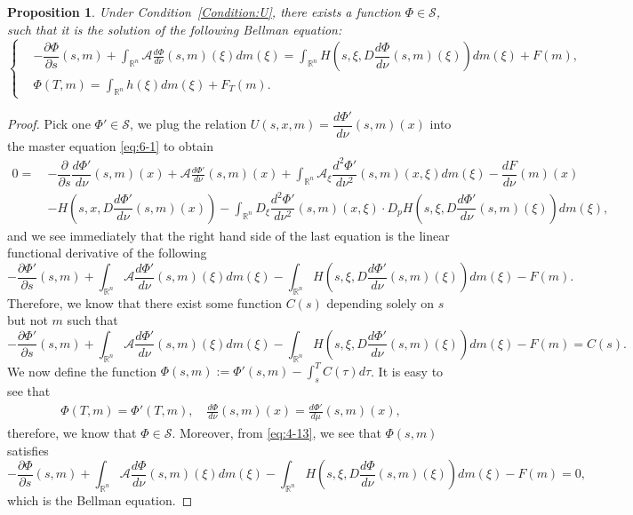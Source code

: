\documentclass[11pt]{article}
\numberwithin{equation}{section}
\newtheorem{proposition}[theorem]{Proposition}
\newcommand{\brn}{{\mathbb{R}^n}}
\newcommand{\1}{\mbox{1\hspace{-1mm}I}}
\begin{document}
\begin{proposition}\label{prop:6-2} 
Under Condition~\ref{Condition:U}, there exists a function $\Phi\in\mathcal{S}$, such that it is the solution of the following Bellman equation: 
\begin{equation}\label{eq:6-5}
    \left\{
        \begin{aligned}
            &-\dfrac{\partial \Phi}{\partial s}(s,m)+\int_{\brn}\mathcal{A}\frac{d\Phi}{d\nu}(s,m)(\xi)dm(\xi)=\int_{\brn}H\left(s,\xi,D\dfrac{d\Phi}{d\nu}(s,m)(\xi)\right)dm(\xi)+F(m),\\
            &\Phi(T,m)=\int_{\brn}h(\xi)dm(\xi)+F_{T}(m).
        \end{aligned}
    \right.
\end{equation} 
\end{proposition}

\begin{proof}
Pick one $\Phi'\in\mathcal{S}$, we plug the relation $U(s,x,m)=\dfrac{d\Phi'}{d\nu}(s,m)(x)$ into the master equation \eqref{eq:6-1} to obtain 
\begin{align*}
    0=\ &-\dfrac{\partial}{\partial s}\dfrac{d\Phi'}{d\nu}(s,m)(x)+\mathcal{A}\frac{d\Phi'}{d\nu}(s,m)(x)+\int_{\brn}\mathcal{A}_{\xi}\dfrac{d^{2}\Phi'}{d\nu^{2}}(s,m)(x,\xi)dm(\xi)- \dfrac{dF}{d\nu}(m)(x)\\
    & - H\left(s,x,D\dfrac{d\Phi'}{d\nu}(s,m)(x)\right) - \int_{\brn}D_{\xi}\dfrac{d^{2}\Phi'}{d\nu^{2}}(s,m)(x,\xi)\cdot D_p H\left(s,\xi,D\dfrac{d\Phi'}{d\nu}(s,m)(\xi)\right)dm(\xi),
\end{align*}
and we see immediately that the right hand side of the last equation is the linear functional derivative of the following
\begin{equation*}
    -\dfrac{\partial \Phi'}{\partial s}(s,m)+\int_{\brn}\mathcal{A}\dfrac{d\Phi'}{d\nu}(s,m)(\xi)dm(\xi)-\int_{\brn}H\left(s,\xi,D\dfrac{d\Phi'}{d\nu}(s,m)(\xi)\right)dm(\xi)-F(m).
\end{equation*}
Therefore, we know that there exist some function $C(s)$ depending solely on $s$ but not $m$ such that 
\begin{equation}\label{eq:4-13}
    -\dfrac{\partial \Phi'}{\partial s}(s,m)+\int_{\brn}\mathcal{A}\dfrac{d\Phi'}{d\nu}(s,m)(\xi)dm(\xi)-\int_{\brn}H\left(s,\xi,D\dfrac{d\Phi'}{d\nu}(s,m)(\xi)\right)dm(\xi)-F(m)=C(s).
\end{equation}
We now define the function $\Phi(s,m):=\Phi'(s,m)-\int_s^T C(\tau)d\tau$. It is easy to see that 
\begin{align*}
    \Phi(T,m)=\Phi'(T,m),\quad \frac{d\Phi}{d\nu}(s,m)(x)=\frac{d\Phi'}{d\mu}(s,m)(x),
\end{align*}
therefore, we know that $\Phi\in\mathcal{S}$. Moreover, from \eqref{eq:4-13}, we see that $\Phi(s,m)$ satisfies
\begin{equation*}
    -\dfrac{\partial \Phi}{\partial s}(s,m)+\int_{\brn}\mathcal{A}\dfrac{d\Phi}{d\nu}(s,m)(\xi)dm(\xi)-\int_{\brn}H\left(s,\xi,D\dfrac{d\Phi}{d\nu}(s,m)(\xi)\right)dm(\xi)-F(m)=0,
\end{equation*}
which is the Bellman equation. 
\end{proof}
\end{document}
